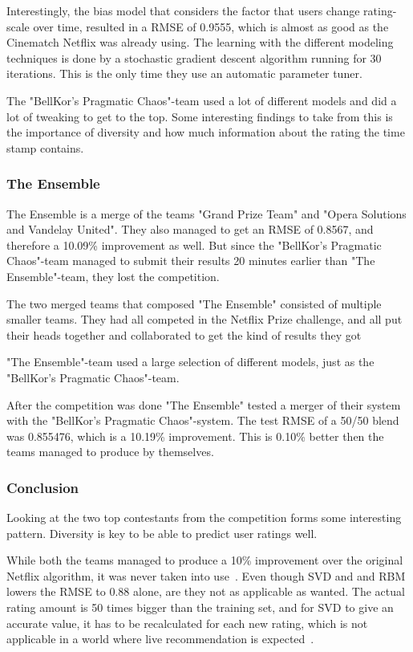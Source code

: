 Interestingly, the bias model that considers the factor that users change rating-scale over time, resulted in a RMSE of 0.9555, which is almost as good as the Cinematch Netflix was already using. The learning with the different modeling techniques is done by a stochastic gradient descent algorithm running for 30 iterations. This is the only time they use an automatic parameter tuner. \cite{BellKor-2008-sol}

The "BellKor's Pragmatic Chaos"-team used a lot of different models and did a lot of tweaking to get to the top. Some interesting findings to take from this is the importance of diversity and how much information about the rating the time stamp contains.

\subsubsection{The Ensemble}
The Ensemble is a merge of the teams "Grand Prize Team" and "Opera Solutions and Vandelay United". They also managed to get an RMSE of 0.8567, and therefore a 10.09\% improvement as well. But since the "BellKor's Pragmatic Chaos"-team managed to submit their results 20 minutes earlier than "The Ensemble"-team, they lost the competition.

The two merged teams that composed "The Ensemble" consisted of multiple smaller teams. They had all competed in the Netflix Prize challenge, and all put their heads together and collaborated to get the kind of results they got

"The Ensemble"-team used a large selection of different models, just as the "BellKor's Pragmatic Chaos"-team.

After the competition was done "The Ensemble" tested a merger of their system with the "BellKor's Pragmatic Chaos"-system. The test RMSE of a 50/50 blend was 0.855476, which is a 10.19\% improvement. This is 0.10\% better then the teams managed to produce by themselves.

\subsubsection{Conclusion}
Looking at the two top contestants from the competition forms some interesting pattern. Diversity is key to be able to predict user ratings well.

While both the teams managed to produce a 10\% improvement over the original Netflix algorithm, it was never taken into use~\cite{nfbeyond5}. Even though SVD and and RBM lowers the RMSE to 0.88 alone, are they not as applicable as wanted. The actual rating amount is 50 times bigger than the training set, and for SVD to give an accurate value, it has to be recalculated for each new rating, which is not applicable in a world where live recommendation is expected~\cite{nfbeyond5}.



